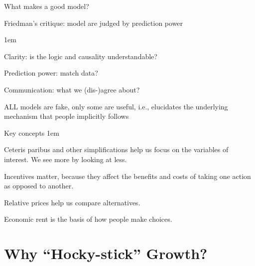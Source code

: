 \documentclass[11pt,aspectratio=43,usenames,dvipsnames]{beamer}
\let\olditemize=\itemize
\let\endolditemize=\enditemize
\renewenvironment{itemize}{\olditemize \itemsep1em}{\endolditemize}
\theoremstyle{definition}
\begin{document}
\begin{frame}{What makes a good model?}
\label{slide:What_makes_a_good_model_}
    \begin{center}
        \alert{Friedman's critique}: model are judged by \alert{prediction power}
    \end{center}
    \begin{itemize}
        \item Clarity: is the logic and causality understandable?
        \item Prediction power: match data?
        \item Communication: what we (dis-)agree about?
    \end{itemize}

    \vspace{0.7em}

    ALL models are fake, only some are useful, i.e., elucidates the \alert{underlying mechanism} that people implicitly follows

\end{frame}

\begin{frame}{Key concepts}
\label{slide:Key_concepts}
    \begin{itemize}
        \item \alert{Ceteris paribus} and other simplifications help us focus on the variables of interest. We see more by looking at less.
        \item \alert{Incentives} matter, because they affect the benefits and costs of taking one action as opposed to another.
        \item \alert{Relative prices} help us compare alternatives.
        \item \alert{Economic rent} is the basis of how people make choices.
    \end{itemize}
\end{frame}

\section[Growth?]{Why ``Hocky-stick'' Growth?}
\label{sec:Why___Hocky_stick___Growth_}
\end{document}
